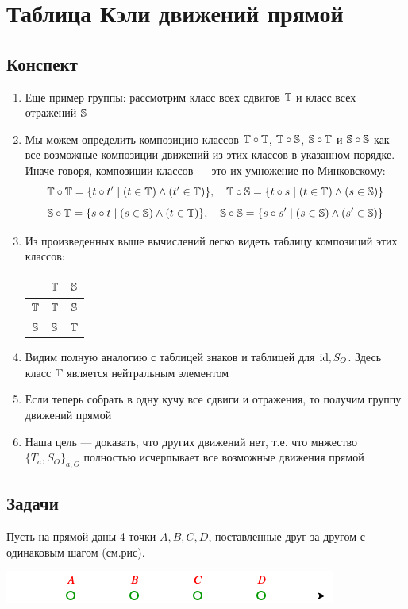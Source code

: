 \section{Таблица Кэли движений прямой}

\subsection*{Конспект}
\begin{enumerate}\setlength{\itemsep}{1pt}
\item Еще пример группы: рассмотрим класс всех сдвигов $\T$ и класс всех отражений $\S$
\item Мы можем определить композицию классов $\T\circ \T$, $\T\circ \S$, $\S\circ \T$ и $\S\circ \S$ как все возможные композиции движений из этих классов в указанном порядке. Иначе говоря, композиции классов --- это их умножение по Минковскому:
$$
\T\circ \T = \{t\circ t'\mid (t\in\T)\land(t'\in\T)\},\quad \T\circ \S = \{t\circ s\mid (t\in\T)\land(s\in\S)\}
$$
$$
\S\circ \T = \{s\circ t\mid (s\in\S)\land(t\in\T)\},\quad \S\circ \S = \{s\circ s'\mid (s\in\S)\land(s'\in\S)\}
$$
\item Из произведенных выше вычислений легко видеть таблицу композиций этих классов:
\begin{center}
\begin{tabular}{c|c|c|}
  & $\T$ & $\S$ \\
 \hline
$\T$ & $\T$ & $\S$ \\
 \hline
$\S$ & $\S$ & $\T$ \\
\hline
\end{tabular}
\end{center}
\item Видим полную аналогию с таблицей знаков и таблицей для $\id, S_O$. Здесь класс $\T$ является нейтральным элементом
\item Если теперь собрать в одну кучу все сдвиги и отражения, то получим группу движений прямой
\item Наша цель --- доказать, что других движений нет, т.е. что мнжество $\{T_a,S_O\}_{a,O}$ полностью исчерпывает все возможные движения прямой
\end{enumerate}

\subsection*{Задачи}

Пусть на прямой даны 4 точки $A,B,C,D$, поставленные друг за другом с одинаковым шагом (см.рис).
\begin{center}
\includegraphics[scale=0.7]{ABCD.png}
\end{center}


